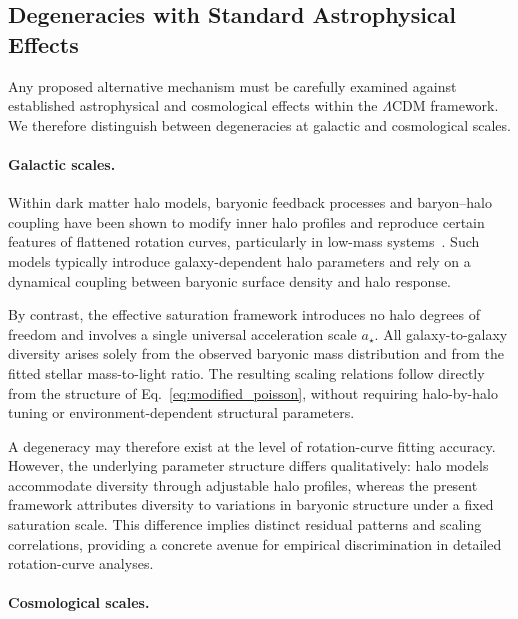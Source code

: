 \subsection{Degeneracies with Standard Astrophysical Effects}
  \label{subsec:degeneracies}

  Any proposed alternative mechanism must be carefully examined against
  established astrophysical and cosmological effects within the
  $\Lambda$CDM framework.
  We therefore distinguish between degeneracies at galactic and cosmological scales.

  \paragraph{Galactic scales.}

    Within dark matter halo models, baryonic feedback processes and
    baryon--halo coupling have been shown to modify inner halo profiles
    and reproduce certain features of flattened rotation curves,
    particularly in low-mass systems~\cite{DiCintio2014Feedback}.
    Such models typically introduce galaxy-dependent halo parameters
    and rely on a dynamical coupling between baryonic surface density
    and halo response.

    By contrast, the effective saturation framework introduces no halo
    degrees of freedom and involves a single universal acceleration scale
    $a_\star$.
    All galaxy-to-galaxy diversity arises solely from the observed baryonic
    mass distribution and from the fitted stellar mass-to-light ratio.
    The resulting scaling relations follow directly from the structure of
    Eq.~\eqref{eq:modified_poisson}, without requiring halo-by-halo tuning
    or environment-dependent structural parameters.

    A degeneracy may therefore exist at the level of rotation-curve
    fitting accuracy.
    However, the underlying parameter structure differs qualitatively:
    halo models accommodate diversity through adjustable halo profiles,
    whereas the present framework attributes diversity to variations
    in baryonic structure under a fixed saturation scale.
    This difference implies distinct residual patterns and scaling
    correlations, providing a concrete avenue for empirical discrimination
    in detailed rotation-curve analyses.

  \paragraph{Cosmological scales.}

